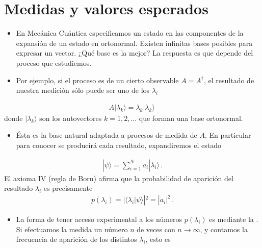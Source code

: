 \documentclass[letterpaper,10pt,english]{jupyterBook}
\newcommand{\ket}[1]{|#1\rangle}
\newcommand{\braket}[2]{\langle #1|#2\rangle}
\begin{document}
\section{Medidas y valores esperados}
\label{\detokenize{docs/Part_01_Formalismo/Chapter_02_01_Fundamentos_MC_myst:medidas-y-valores-esperados}}\begin{itemize}
\item {} 
\sphinxAtStartPar
En Mecánica Cuántica especificamos un estado en las componentes de la expansión de un estado en  ortonormal.
Existen infinitas bases posibles para expresar un vector. ¿Qué base es la mejor? La respuesta es que depende del proceso que estudiemos.

\end{itemize}
\begin{itemize}
\item {} 
\sphinxAtStartPar
Por ejemplo, si el proceso es  de un cierto observable \(A=A^\dagger\), el resultado de nuestra medición sólo puede ser uno de los  \(\lambda_i\)

\end{itemize}
\begin{equation*}
\begin{split}
A \ket{\lambda_k} = \lambda_k \ket{\lambda_k}\, 
\end{split}
\end{equation*}
\sphinxAtStartPar
donde \(\ket{\lambda_k}\) son los autovectores \({k=1,2,...}\) que forman una base ortonormal.
\begin{itemize}
\item {} 
\sphinxAtStartPar
Ésta es la base natural adaptada a procesos de medida de \(A\). En particular para conocer  se producirá cada resultado, expandiremos el estado

\end{itemize}
\begin{equation*}
\begin{split}
\ket{\psi} = \sum_{i=1}^N a_i \ket{\lambda_i}\, .
\end{split}
\end{equation*}
\sphinxAtStartPar
El axioma IV (regla de Born) afirma que la probabilidad de aparición del resultado \(\lambda_i\) es precisamente
\begin{equation*}
\begin{split}
p(\lambda_i)=|\braket{\lambda_i}{\psi}|^2  = |a_i|^2 \, .
\end{split}
\end{equation*}\begin{itemize}
\item {} 
\sphinxAtStartPar
La forma de tener acceso experimental a los números \(p(\lambda_i)\)  es mediante la . Si efectuamos la medida un número \(n\) de veces con \(n\to \infty\), y contamos la frecuencia de aparición de los distintos \(\lambda_i\), esto es

\end{itemize}
\end{document}
